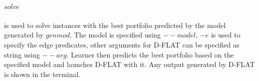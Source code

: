 \paragraph{\inline$solve$}
is used to solve instances with the best portfolio predicted by the model generated by \inline$genmod$. The model is specified using \inline$--model$, \inline$-e$ is used to specify the edge predicates, other arguments for \mbox{D-FLAT} can be specified as string using \inline$--arg$.
Learner then predicts the best portfolio based on the specified model and launches \mbox{D-FLAT} with it. Any output generated by \mbox{D-FLAT} is shown in the terminal.



